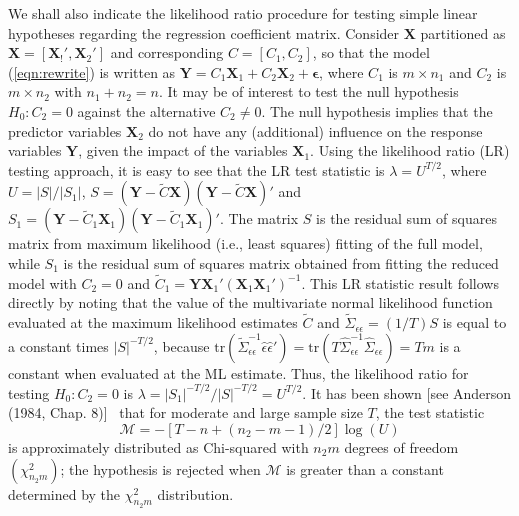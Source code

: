 \begin{result}
We shall also indicate the likelihood ratio procedure for testing simple linear hypotheses regarding the regression coefficient matrix. Consider $\mathbf{X}$ partitioned as $\mathbf{X}=[\mathbf{X}_!', \mathbf{X}_2']$ and corresponding $C=[C_1,C_2]$, so that the model (\ref{eqn:rewrite}) is written as $\mathbf{Y}=C_1 \mathbf{X}_1+C_2 \mathbf{X}_2+\mathbf{\epsilon}$, where $C_1$ is $m\times n_1$ and $C_2$ is $m \times n_2$ with $n_1+n_2=n$. It may be of interest to test the null hypothesis $H_0: C_2=0$ against the alternative $C_2 \neq 0$. The null hypothesis implies that the predictor variables $\mathbf{X}_2$ do not have any (additional) influence on the response variables $\mathbf{Y}$, given the impact of the variables $\mathbf{X}_1$. Using the likelihood ratio (LR) testing approach, it is easy to see that the LR test statistic is $\lambda=U^{T/2}$, where $U=|S|/|S_1|$, $S=(\mathbf{Y}-\tilde{C}\mathbf{X})(\mathbf{Y}-\tilde{C}\mathbf{X})'$ and $S_1=(\mathbf{Y}-\tilde{C}_1\mathbf{X}_1)(\mathbf{Y}-\tilde{C}_1\mathbf{X}_1)'$. The matrix $S$ is the residual sum of squares matrix from maximum likelihood (i.e., least squares) fitting of the full model, while $S_1$ is the residual sum of squares matrix obtained from fitting the reduced model with $C_2=0$ and $\tilde{C}_1=\mathbf{Y}\mathbf{X}_1'(\mathbf{X}_1\mathbf{X}_1')^{-1}$. This LR statistic result follows directly by noting that the value of the multivariate normal likelihood function evaluated at the maximum likelihood estimates $\tilde{C}$ and $\tilde{\Sigma}_{\epsilon\epsilon}=(1/T)S$ is equal to a constant times $|S|^{-T/2}$, because $\text{tr}\left(\tilde{\Sigma}_{\epsilon\epsilon}^{-1} \hat{\epsilon} \hat{\epsilon}'\right)=\text{tr}\left(T \hat{\Sigma}_{\epsilon\epsilon}^{-1} \hat{\Sigma}_{\epsilon\epsilon}\right)=Tm$ is a constant when evaluated at the ML estimate. Thus, the likelihood ratio for testing $H_0: C_2=0$ is $\lambda=|S_1|^{-T/2}/|S|^{-T/2}=U^{T/2}$. It has been shown [see Anderson (1984, Chap. 8)]~\cite{andersontw2} that for moderate and large sample size $T$, the test statistic 
	\begin{equation}\label{eqn:mathcal}
	\mathcal{M}=-[T-n+(n_2-m-1)/2] \log(U)
	\end{equation}
is approximately distributed as Chi-squared with $n_2m$ degrees of freedom $(\chi_{n_2m}^2)$; the hypothesis is rejected when $\mathcal{M}$ is greater than a constant determined by the $\chi_{n_2m}^2$ distribution. 
\end{result}


